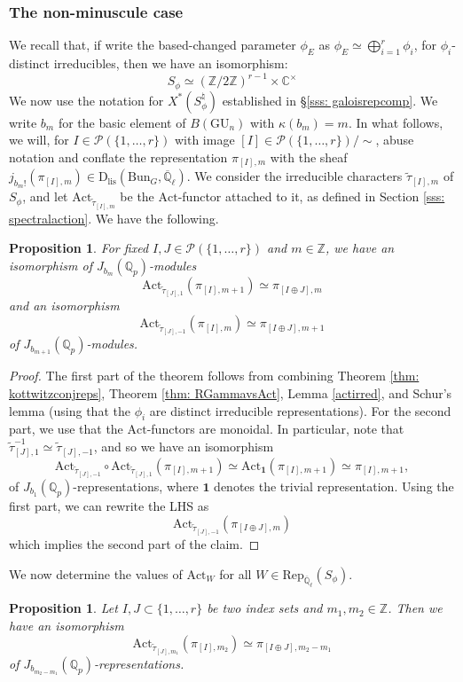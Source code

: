 \documentclass[reqno,11pt]{amsart}
\newtheorem{proposition}[theorem]{Proposition}
\theoremstyle{remark}
\newcommand{\GU}{\mathrm{GU}}
\newcommand{\Z}{\mathbb{Z}}
\newcommand{\C}{\mathbb{C}}
\newcommand{\mc}{\mathcal}
\newcommand{\Act}{\mathrm{Act}}
\newcommand{\Bun}{\mathrm{Bun}}
\newcommand{\Rep}{\mathrm{Rep}}
\newcommand{\Dlis}{\mathrm{D}_{\mathrm{lis}}}
\newcommand{\ttau}{\tilde{\tau}}
\def\ol{\overline}
\begin{document}
\subsubsection{The non-minuscule case}
We recall that, if write the based-changed parameter $\phi_{E}$ as $\phi_{E} \simeq \bigoplus_{i = 1}^{r} \phi_{i}$, for $\phi_{i}$-distinct irreducibles, then we have an isomorphism: 
\[ S_{\phi} \simeq (\mathbb{Z}/2\mathbb{Z})^{r - 1} \times  \C^{\times} \]
We now use the notation for $X^*(S^{\natural}_{\phi})$ established in \S\ref{sss: galoisrepcomp}. We write $b_{m}$ for the basic element of $B(\GU_n)$ with $\kappa(b_{m}) = m$. In what follows, we will, for $I \in \mc{P}(\{1,\ldots,r\})$ with image $[I] \in \mc{P}(\{1,\ldots,r\})/\sim$, abuse notation and conflate the representation $\pi_{[I],m}$ with the sheaf $j_{b_{m}!}(\pi_{[I],m}) \in \Dlis(\Bun_{G},\overline{\mathbb{Q}}_{\ell})$. We consider the irreducible characters $\ttau_{[I],m}$ of $S_{\phi}$, and let $\Act_{\ttau_{[I],m}}$ be the $\Act$-functor attached to it, as defined in Section \ref{sss: spectralaction}.  We have the following. 
\begin{proposition}{\label{ActgenGUn}}
For fixed $I,J \in \mc{P}(\{1,\dots,r\})$ and $m \in \Z$, we have an isomorphism of $J_{b_m}(\mathbb{Q}_{p})$-modules
\[ \Act_{\ttau_{[J],1}}(\pi_{[I],m+1}) \simeq \pi_{[I \oplus J],m} \]
and an isomorphism 
\[ \Act_{\ttau_{[J],-1}}(\pi_{[I],m}) \simeq \pi_{[I \oplus J],m+1} \]
of $J_{b_{m+1}}(\mathbb{Q}_{p})$-modules.
\end{proposition} 
\begin{proof}
The first part of the theorem follows from combining Theorem \ref{thm: kottwitzconjreps}, Theorem \ref{thm: RGammavsAct}, Lemma \ref{actirred}, and Schur's lemma (using that the $\phi_{i}$ are distinct irreducible representations). For the second part, we use that the $\Act$-functors are monoidal. In particular, note that $\ttau_{[J],1}^{-1} \simeq \ttau_{[J],-1}$, and so we have an isomorphism
\[ \Act_{\ttau_{[J],-1}} \circ \Act_{\ttau_{[J],1}}(\pi_{[I],m+1}) \simeq  \Act_{\mathbf{1}}(\pi_{[I],m+1}) \simeq \pi_{[I],m+1}, \]
of $J_{b_{1}}(\mathbb{Q}_{p})$-representations, where $\mathbf{1}$ denotes the trivial representation. Using the first part, we can rewrite the LHS as 
\[ \Act_{\ttau_{[J],-1}}(\pi_{[I \oplus J],m}) \]
which implies the second part of the claim. 
\end{proof}
We now determine the values of $\Act_{W}$ for all $W \in \Rep_{\ol{\mathbb{Q}}_{\ell}}(S_{\phi})$.  
\begin{proposition}{\label{prop: Allactval}}
Let $I,J \subset \{1,\ldots,r\}$ be two index sets and $m_1,m_2 \in \mathbb{Z}$. Then we have an isomorphism
\[ \Act_{\ttau_{[J],m_1}}(\pi_{[I],m_2}) \simeq \pi_{[I \oplus J],m_2 - m_{1}} \]
of $J_{b_{m_{2} - m_{1}}}(\mathbb{Q}_{p})$-representations. 
\end{proposition}
\end{document}
